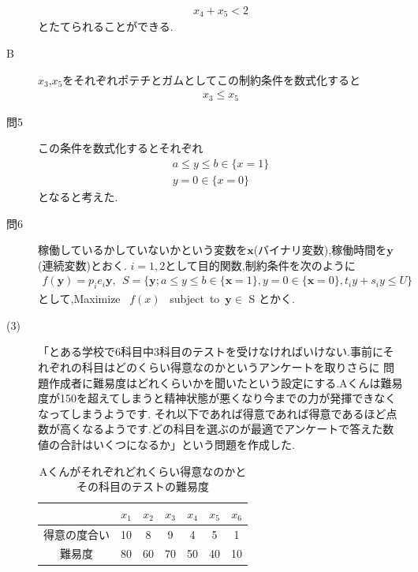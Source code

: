 \documentclass[12pt]{jarticle}
\begin{document}
\begin{description}
\begin{eqnarray}
		      x_4+x_5<2\nonumber
	      \end{eqnarray}
	      とたてられることができる.
	\item[B]
	      $x_3$,$x_5$をそれぞれポテチとガムとしてこの制約条件を数式化すると
	      \begin{eqnarray}
		      x_3\leq x_5\nonumber
	      \end{eqnarray}
	\item[問5]
	      この条件を数式化するとそれぞれ
	      \begin{eqnarray}
		      a\leq y\leq b \in \{x=1\}\nonumber\\
		      y=0\in \{x=0\}\nonumber
	      \end{eqnarray}
	      となると考えた. 
	\item[問6]
	      稼働しているかしていないかという変数を$\boldsymbol{x}$(バイナリ変数),稼働時間を$\boldsymbol{y}$(連続変数)とおく.
	      $i=1,2$として目的関数,制約条件を次のように
	      \begin{eqnarray}
		      f(\boldsymbol{y})=p_ie_i\boldsymbol{y},\ \ S=\{\boldsymbol{y};a\leq y\leq b\in \{\boldsymbol{x}=1\},y=0\in \{\boldsymbol{x}=0\},t_iy+s_iy\leq U\}
	      \end{eqnarray}
	      として,Maximize \ $f(x)$ \ subject\ to\ $\boldsymbol{y}\in$ S とかく.
	\item[(3)]
	      「とある学校で6科目中3科目のテストを受けなければいけない.事前にそれぞれの科目はどのくらい得意なのかというアンケートを取りさらに
	      問題作成者に難易度はどれくらいかを聞いたという設定にする.Aくんは難易度が150を超えてしまうと精神状態が悪くなり今までの力が発揮できなくなってしまうようです.
	      それ以下であれば得意であれば得意であるほど点数が高くなるようです.どの科目を選ぶのが最適でアンケートで答えた数値の合計はいくつになるか」という問題を作成した.
	      \begin{table}[h]
		      \caption{Aくんがそれぞれどれくらい得意なのかとその科目のテストの難易度}
		      \begin{center}
			      \begin{tabular}{|c|c|c|c|c|c|c|}
				      \hline
				                   & $x_1$ & $x_2$ & $x_3$ & $x_4$ & $x_5$ & $x_6$ \\
				      \hline
				      得意の度合い & 10    & 8     & 9     & 4     & 5     & 1     \\
				      \hline
				      難易度       & 80    & 60    & 70    & 50    & 40    & 10    \\
				      \hline
			      \end{tabular}

\end{center}
\end{table}
\end{description}
\end{document}
